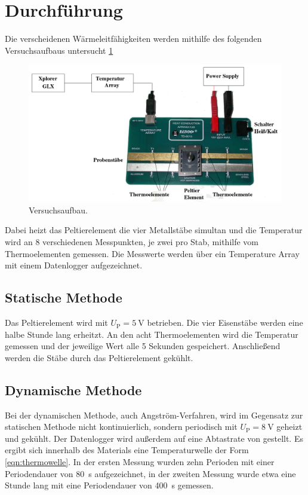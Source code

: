 \section{Durchführung}
\label{sec:Durchführung}
Die verscheidenen Wärmeleitfähigkeiten werden mithilfe des folgenden Versuchsaufbaus
untersucht \ref{fig:aufbau}
\begin{figure}
    \centering
    \includegraphics[width=\textwidth]{content/aufbau.png}
    \caption{Versuchsaufbau.}
    \label{fig:aufbau}
\end{figure}
Dabei heizt das Peltierelement die vier Metallstäbe simultan und die Temperatur wird an 8
verschiedenen Messpunkten, je zwei pro Stab, mithilfe vom Thermoelementen gemessen. Die
Messwerte werden über ein Temperature Array mit einem Datenlogger aufgezeichnet.
%
\subsection{Statische Methode}
\label{sec:statische Methode}
Das Peltierelement wird mit $U_\text{P}=\SI{5}{\volt}$ betrieben.
Die vier Eisenstäbe werden eine halbe Stunde lang erheitzt.
An den acht Thermoelementen wird die Temperatur gemessen und der jeweilige Wert alle 5 Sekunden gespeichert.
Anschließend werden die Stäbe durch das Peltierelement gekühlt.
%
\subsection{Dynamische Methode}
\label{sec:dynamische Methode}
Bei der dynamischen Methode, auch Angström-Verfahren, wird im Gegensatz zur statischen Methode nicht kontinuierlich, 
sondern periodisch mit $U_\text{P}=\SI{8}{\volt}$ geheizt und gekühlt. 
Der Datenlogger wird außerdem auf eine Abtastrate von  gestellt.
Es ergibt sich innerhalb des Materials eine Temperaturwelle der Form \eqref{eqn:thermowelle}.
In der ersten Messung wurden zehn Perioden mit einer Periodendauer von \SI{80}{\second} aufgezeichnet, 
in der zweiten Messung wurde etwa eine Stunde lang mit eine Periodendauer von \SI{400}{\second} gemessen.

